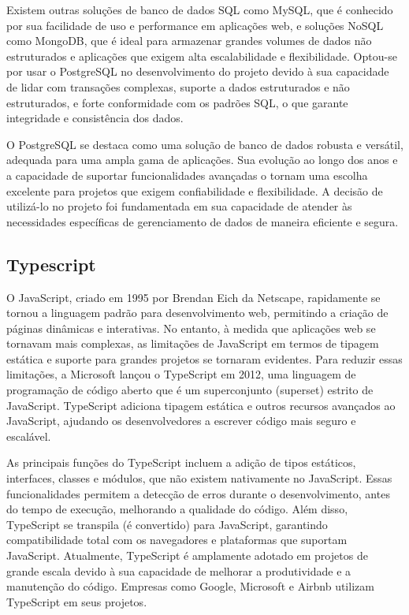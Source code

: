 Existem outras soluções de banco de dados SQL como MySQL, que é conhecido por sua facilidade de uso e performance em aplicações web, e soluções NoSQL como MongoDB, que é ideal para armazenar grandes volumes de dados não estruturados e aplicações que exigem alta escalabilidade e flexibilidade. Optou-se por usar o PostgreSQL no desenvolvimento do projeto devido à sua capacidade de lidar com transações complexas, suporte a dados estruturados e não estruturados, e forte conformidade com os padrões SQL, o que garante integridade e consistência dos dados.

O PostgreSQL se destaca como uma solução de banco de dados robusta e versátil, adequada para uma ampla gama de aplicações. Sua evolução ao longo dos anos e a capacidade de suportar funcionalidades avançadas o tornam uma escolha excelente para projetos que exigem confiabilidade e flexibilidade. A decisão de utilizá-lo no projeto foi fundamentada em sua capacidade de atender às necessidades específicas de gerenciamento de dados de maneira eficiente e segura.

\subsection{Typescript}

O JavaScript, criado em 1995 por Brendan Eich da Netscape, rapidamente se tornou a linguagem padrão para desenvolvimento web, permitindo a criação de páginas dinâmicas e interativas. No entanto, à medida que aplicações web se tornavam mais complexas, as limitações de JavaScript em termos de tipagem estática e suporte para grandes projetos se tornaram evidentes. Para reduzir essas limitações, a Microsoft lançou o TypeScript em 2012, uma linguagem de programação de código aberto que é um superconjunto (superset) estrito de JavaScript. TypeScript adiciona tipagem estática e outros recursos avançados ao JavaScript, ajudando os desenvolvedores a escrever código mais seguro e escalável.

As principais funções do TypeScript incluem a adição de tipos estáticos, interfaces, classes e módulos, que não existem nativamente no JavaScript. Essas funcionalidades permitem a detecção de erros durante o desenvolvimento, antes do tempo de execução, melhorando a qualidade do código. Além disso, TypeScript se transpila (é convertido) para JavaScript, garantindo compatibilidade total com os navegadores e plataformas que suportam JavaScript. Atualmente, TypeScript é amplamente adotado em projetos de grande escala devido à sua capacidade de melhorar a produtividade e a manutenção do código. Empresas como Google, Microsoft e Airbnb utilizam TypeScript em seus projetos.

